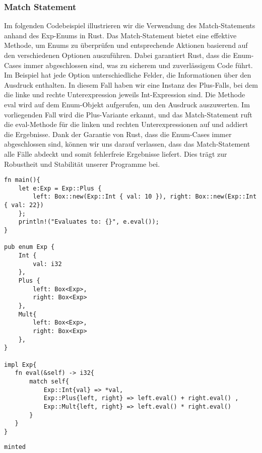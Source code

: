 \documentclass[a4paper, 1ppt]{article}
\begin{document}
\subsubsection{Match Statement}
Im folgenden Codebeispiel illustrieren wir die Verwendung des Match-Statements anhand des Exp-Enums in Rust. Das Match-Statement bietet eine effektive Methode, um Enums zu überprüfen und entsprechende Aktionen basierend auf den verschiedenen Optionen auszuführen. Dabei garantiert Rust, dass die Enum-Cases immer abgeschlossen sind, was zu sicherem und zuverlässigem Code führt.
Im Beispiel hat jede Option unterschiedliche Felder, die Informationen über den Ausdruck enthalten. In diesem Fall haben wir eine Instanz des Plus-Falls, bei dem die linke und rechte Unterexpression jeweils Int-Expression sind.
Die Methode eval wird auf dem Enum-Objekt aufgerufen, um den Ausdruck auszuwerten. Im vorliegenden Fall wird die Plus-Variante erkannt, und das Match-Statement ruft die eval-Methode für die linken und rechten Unterexpressionen auf und addiert die Ergebnisse.
Dank der Garantie von Rust, dass die Enum-Cases immer abgeschlossen sind, können wir uns darauf verlassen, dass das Match-Statement alle Fälle abdeckt und somit fehlerfreie Ergebnisse liefert. Dies trägt zur Robustheit und Stabilität unserer Programme bei.
\begin{verbatim}
fn main(){
    let e:Exp = Exp::Plus { 
        left: Box::new(Exp::Int { val: 10 }), right: Box::new(Exp::Int { val: 22})
    };
    println!("Evaluates to: {}", e.eval());
}

pub enum Exp {
    Int {
        val: i32
    },
    Plus {
        left: Box<Exp>,
        right: Box<Exp>
    },
    Mult{
        left: Box<Exp>,
        right: Box<Exp>
    },
}

impl Exp{
   fn eval(&self) -> i32{
       match self{
           Exp::Int{val} => *val,
           Exp::Plus{left, right} => left.eval() + right.eval() ,
           Exp::Mult{left, right} => left.eval() * right.eval()
       }
   }
}
\end{verbatim}
\begin{verbatim}
minted\end{verbatim}
\end{document}
